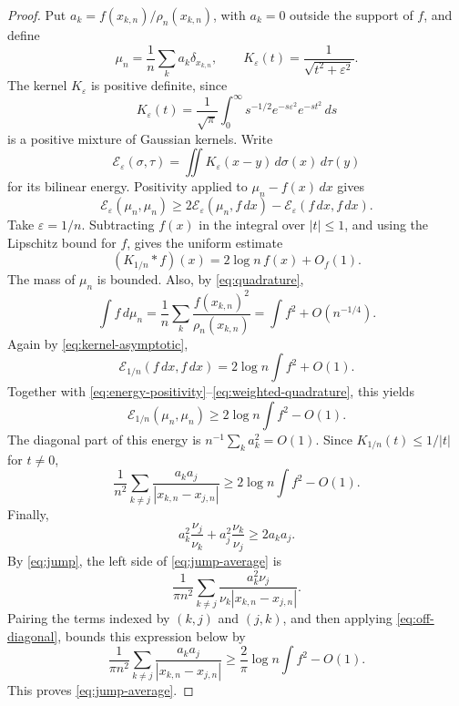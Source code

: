 \documentclass[11pt]{article}
\theoremstyle{remark}
\numberwithin{equation}{section}
\begin{document}
\begin{proof}
Put \(a_k=f(x_{k,n})/\rho_n(x_{k,n})\), with \(a_k=0\) outside the support of
\(f\), and define
\[
 \mu_n=\frac1n\sum_k a_k\delta_{x_{k,n}},\qquad
 K_\varepsilon(t)=\frac1{\sqrt{t^2+\varepsilon^2}}.
\]
The kernel \(K_\varepsilon\) is positive definite, since
\[
 K_\varepsilon(t)=\frac1{\sqrt\pi}
       \int_0^\infty s^{-1/2}e^{-s\varepsilon^2}e^{-st^2}\,ds
\]
is a positive mixture of Gaussian kernels. Write
\[
 \mathcal E_\varepsilon(\sigma,\tau)
 =\iint K_\varepsilon(x-y)\,d\sigma(x)\,d\tau(y)
\]
for its bilinear energy. Positivity applied to
\(\mu_n-f(x)\,dx\) gives
\begin{equation}\label{eq:energy-positivity}
 \mathcal E_\varepsilon(\mu_n,\mu_n)
 \ge2\mathcal E_\varepsilon(\mu_n,f\,dx)
       -\mathcal E_\varepsilon(f\,dx,f\,dx).
\end{equation}
Take \(\varepsilon=1/n\). Subtracting \(f(x)\) in the integral over
\(|t|\le1\), and using the Lipschitz bound for \(f\), gives the uniform
estimate
\begin{equation}\label{eq:kernel-asymptotic}
 (K_{1/n}*f)(x)=2\log n\,f(x)+O_f(1).
\end{equation}
The mass of \(\mu_n\) is bounded. Also, by \eqref{eq:quadrature},
\begin{equation}\label{eq:weighted-quadrature}
 \int f\,d\mu_n
 =\frac1n\sum_k\frac{f(x_{k,n})^2}{\rho_n(x_{k,n})}
 =\int f^2+O(n^{-1/4}).
\end{equation}
Again by \eqref{eq:kernel-asymptotic},
\[
 \mathcal E_{1/n}(f\,dx,f\,dx)=2\log n\int f^2+O(1).
\]
Together with \eqref{eq:energy-positivity}--\eqref{eq:weighted-quadrature}, this
yields
\begin{equation}\label{eq:energy-lower}
 \mathcal E_{1/n}(\mu_n,\mu_n)
 \ge2\log n\int f^2-O(1).
\end{equation}
The diagonal part of this energy is \(n^{-1}\sum_k a_k^2=O(1)\). Since
\(K_{1/n}(t)\le1/|t|\) for \(t\ne0\),
\begin{equation}\label{eq:off-diagonal}
 \frac1{n^2}\sum_{k\ne j}\frac{a_ka_j}{|x_{k,n}-x_{j,n}|}
 \ge2\log n\int f^2-O(1).
\end{equation}
Finally,
\[
 a_k^2\frac{\nu_j}{\nu_k}+a_j^2\frac{\nu_k}{\nu_j}
 \ge2a_ka_j.
\]
By \eqref{eq:jump}, the left side of \eqref{eq:jump-average} is
\[
 \frac1{\pi n^2}\sum_{k\ne j}
       \frac{a_k^2\nu_j}{\nu_k|x_{k,n}-x_{j,n}|}.
\]
Pairing the terms indexed by \((k,j)\) and \((j,k)\), and then applying
\eqref{eq:off-diagonal}, bounds this expression below by
\[
 \frac1{\pi n^2}\sum_{k\ne j}
       \frac{a_ka_j}{|x_{k,n}-x_{j,n}|}
 \ge\frac2\pi\log n\int f^2-O(1).
\]
This proves \eqref{eq:jump-average}.
\end{proof}
\end{document}
